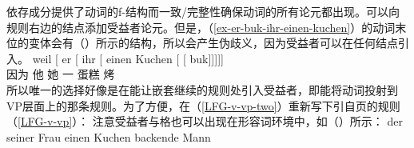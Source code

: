 \ea
\label{lfg-vp-regel-two}
\z
依存成分提供了动词的f-结构而一致/完整性确保动词的所有论元都出现。可以向规则右边的结点添加受益者论元。但是，（\ref{ex-er-buk-ihr-einen-kuchen}）的动词末位的变体会有（）所示的结构，所以会产生伪歧义，因为受益者可以在任何结点引入。
\ea
\gll weil    [ er [ ihr [ einen Kuchen [ [ buk]]]]]\\
     因为 {}        他 {}        她 {}        一 蛋糕       {}        {}       烤\\
\z
所以唯一的选择好像是在能让嵌套继续的规则处引入受益者，即能将动词投射到VP层面上的那条规则。为了方便，在（\ref{LFG-v-vp-two}）重新写下引自\pageref{LFG-v-vp}页的规则（\ref{LFG-v-vp}）：
\ea
\label{LFG-v-vp-two}
\z
注意受益者与格也可以出现在形容词环境中，如（）所示：
\eal
\ex
\gll der seiner Frau einen Kuchen backende Mann\\
